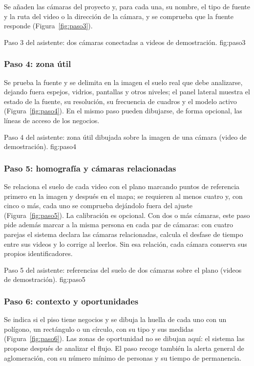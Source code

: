 Se añaden las cámaras del proyecto y, para cada una, su nombre, el tipo de fuente y la ruta del
video o la dirección de la cámara, y se comprueba que la fuente responde
(Figura~\ref{fig:paso3}).

  {Paso 3 del asistente: dos cámaras conectadas a videos de demostración.}
  {fig:paso3}

\subsubsection*{Paso 4: zona útil}

Se prueba la fuente y se delimita en la imagen el suelo real que debe analizarse, dejando fuera
espejos, vidrios, pantallas y otros niveles; el panel lateral muestra el estado de la fuente, su
resolución, su frecuencia de cuadros y el modelo activo (Figura~\ref{fig:paso4}). En el mismo
paso pueden dibujarse, de forma opcional, las líneas de acceso de los negocios.

  {Paso 4 del asistente: zona útil dibujada sobre la imagen de una cámara (video de
   demostración).}
  {fig:paso4}

\subsubsection*{Paso 5: homografía y cámaras relacionadas}

Se relaciona el suelo de cada video con el plano marcando puntos de referencia primero en la
imagen y después en el mapa; se requieren al menos cuatro y, con cinco o más, cada uno se
comprueba dejándolo fuera del ajuste (Figura~\ref{fig:paso5}). La calibración es opcional. Con
dos o más cámaras, este paso pide además marcar a la misma persona en cada par de cámaras: con
cuatro parejas el sistema declara las cámaras relacionadas, calcula el desfase de tiempo entre
sus videos y lo corrige al leerlos. Sin esa relación, cada cámara conserva sus propios
identificadores.

  {Paso 5 del asistente: referencias del suelo de dos cámaras sobre el plano (videos de
   demostración).}
  {fig:paso5}

\subsubsection*{Paso 6: contexto y oportunidades}

Se indica si el piso tiene negocios y se dibuja la huella de cada uno con un polígono, un
rectángulo o un círculo, con su tipo y sus medidas (Figura~\ref{fig:paso6}). Las zonas de
oportunidad no se dibujan aquí: el sistema las propone después de analizar el flujo. El paso
recoge también la alerta general de aglomeración, con su número mínimo de personas y su tiempo
de permanencia.

